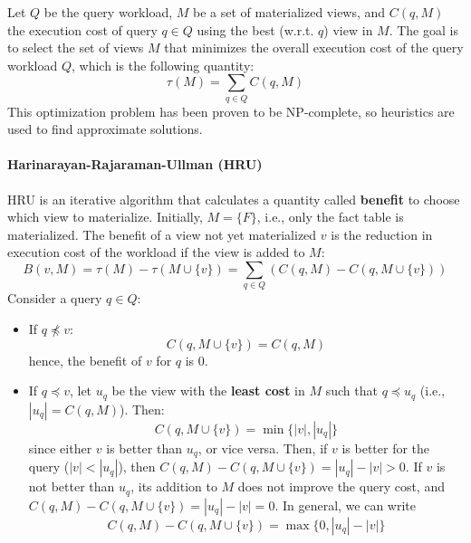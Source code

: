 Let $Q$ be the query workload, $M$ be a set of materialized views, and $C(q,M)$ the execution cost of query $q \in Q$ using the best (w.r.t. $q$) view in $M$. The goal is to select the set of views $M$ that minimizes the overall execution cost of the query workload $Q$, which is the following quantity:
\begin{equation*}
    \tau(M) = \sum_{q \in Q} C(q, M)
\end{equation*}
This optimization problem has been proven to be NP-complete, so heuristics are used to find approximate solutions.

\paragraph{Harinarayan-Rajaraman-Ullman (HRU)} HRU is an iterative algorithm that calculates a quantity called \textbf{benefit} to choose which view to materialize. Initially, $M = \{F\}$, i.e., only the fact table is materialized. The benefit of a view not yet materialized $v$ is the reduction in execution cost of the workload if the view is added to $M$:
\begin{equation*}
    B(v,M) = \tau(M) - \tau(M \cup \{v\}) = \sum_{q \in Q} (C(q,M) - C(q, M \cup \{v\}))
\end{equation*}
Consider a query $q \in Q$:
\begin{itemize}
    \item If $q \not \preceq v$:
    \begin{equation*}
        C(q, M \cup \{v\}) = C(q,M)
    \end{equation*}
    hence, the benefit of $v$ for $q$ is 0.
    \item If $q \preceq v$, let $u_q$ be the view with the \textbf{least cost} in $M$ such that $q \preceq u_q$ (i.e., $|u_q| = C(q,M)$). Then:
    \begin{equation*}
        C(q, M \cup \{v\}) = \min\{|v|, |u_q|\}
    \end{equation*}
    since either $v$ is better than $u_q$, or vice versa. Then, if $v$ is better for the query ($|v| < |u_q|$), then $C(q,M) - C(q, M \cup \{v\}) = |u_q| - |v| > 0$. If $v$ is not better than $u_q$, its addition to $M$ does not improve the query cost, and $C(q,M) - C(q, M \cup \{v\}) = |u_q| - |v| = 0$. In general, we can write
    \begin{equation*}
        C(q, M) - C(q, M \cup \{v\}) = \max\{0, |u_q|-|v|\}
    \end{equation*}
\end{itemize}
